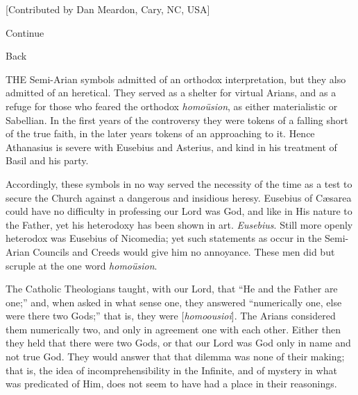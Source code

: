 [Contributed by Dan Meardon, Cary, NC, USA]

Continue

Back


THE Semi-Arian symbols admitted of an orthodox interpretation, but
they also admitted of an heretical. They served as a shelter for
virtual Arians, and as a refuge for those who feared the orthodox \emph{homoüsion},
as either materialistic or Sabellian. In the first years of the
controversy they were tokens of a falling short of the true faith, in
the later years tokens of an approaching to it. Hence Athanasius is
severe with Eusebius and Asterius, and kind in his treatment of Basil
and his party.

Accordingly, these symbols in no way served the
necessity of the time as a test to secure the Church against a
dangerous and insidious heresy. Eusebius of Cæsarea could have no
difficulty in professing our Lord was God, and like in His nature to
the Father, yet his heterodoxy has been shown in art. \emph{Eusebius}.
Still more openly heterodox was Eusebius of Nicomedia; yet such
statements as occur in the Semi-Arian Councils and Creeds would give
him no annoyance. These men did but scruple at the one word \emph{homoüsion}.

The Catholic Theologians taught, with our Lord,
that ``He and the Father are one;'' and, when asked in what sense one,
they answered ``numerically one, else were there two Gods;'' that is,
they were [\emph{homoousioi}]. The Arians considered them numerically
two, and only in agreement one with each other. Either then they
held that there were two Gods, or that our Lord was God only in name
and not true God. They would answer that that dilemma was none of
their making; that is, the idea of incomprehensibility in the
Infinite, and of mystery in what was predicated of Him, does not seem
to have had a place in their reasonings.

